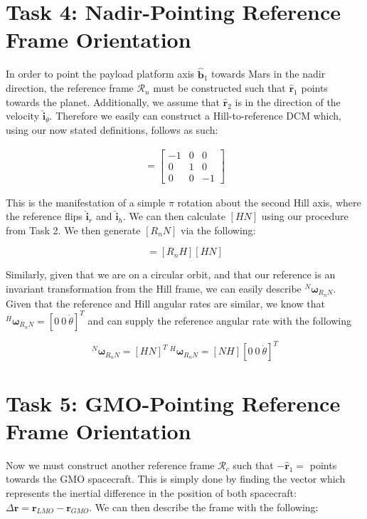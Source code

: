 \documentclass[paper]{aiaaNew}
\begin{document}
\section*{Task 4: Nadir-Pointing Reference Frame Orientation}
In order to point the payload platform axis $\hat{\bm{b}}_1$ towards Mars in the nadir direction, the reference frame $\mathcal{R}_n$ must be constructed such that $\hat{\bm{r}}_1$ points towards the planet. Additionally, we assume that $\hat{\bm{r}}_2$ is in the direction of the velocity $\hat{\bm{i}}_\theta$. Therefore we easily can construct a Hill-to-reference DCM which, using our now stated definitions, follows as such: 

\begin{align}
  [R_nH] =  
  \begin{bmatrix}
  -1 & 0 & 0 \\
  0 & 1 & 0 \\
  0 & 0 & -1
  \end{bmatrix}
\end{align}

This is the manifestation of a simple $\pi$ rotation about the second Hill axis, where the reference flips $\hat{\bm{i}}_r$ and $\hat{\bm{i}}_h$. We can then calculate $[HN]$ using our procedure from Task 2. We then generate $[R_nN]$ via the following:

\begin{equation}
  [R_nN] = [R_nH][HN]
\end{equation}

Similarly, given that we are on a circular orbit, and that our reference is an invariant transformation from the Hill frame, we can easily describe $^N \bm{\omega}_{R_nN}$. Given that the reference and Hill angular rates are similar, we know that $^H \bm{\omega}_{R_nN} = [0 \ 0 \ \dot{\theta}]^T$ and can supply the reference angular rate with the following


\begin{equation}
  ^N \bm{\omega}_{R_nN} = [HN]^T \ ^H \bm{\omega}_{R_nN} = [NH][0 \ 0 \ \dot{\theta}]^T
\end{equation}







\section*{Task 5: GMO-Pointing Reference Frame Orientation}
Now we must construct another reference frame $\mathcal{R}_c$ such that $-\hat{\bm{r}}_1 = $ points towards the GMO spacecraft. This is simply done by finding the vector which represents the inertial difference in the position of both spacecraft: $\Delta\bm{r} = \bm{r}_{LMO} - \bm{r}_{GMO}$. We can then describe the frame with the following:
\end{document}
